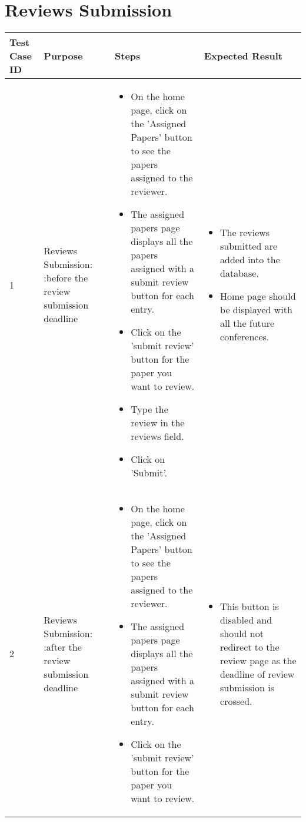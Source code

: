 \documentclass[english,a4paper,12pt]{report}
\begin{document}
\section{Reviews Submission }
\begin{longtable} { | p{2cm} | p{3cm}| p{6cm}| p{6cm} |} 
\hline 
\textbf{Test Case ID} & \textbf{Purpose}  & \textbf{Steps} &\textbf{Expected Result} \\
\hline 1 &  Reviews Submission: :before the review submission deadline &  
\vspace{-5mm}
\begin{itemize}
\item On the home page, click on the 'Assigned Papers' button to see the papers assigned to the reviewer.
\item The assigned papers page displays all the papers assigned with a submit review button for each entry.
\item Click on the 'submit review' button for the paper you want to review.
\item Type the review in the reviews field.
\item Click on 'Submit'.
\end{itemize}&
\vspace{-5mm}
\begin{itemize}
\item The reviews submitted are added into the database.
\item Home page should be displayed with all the future conferences.
\end{itemize}\\
\hline 2 &  Reviews Submission: :after the review submission deadline &  
\vspace{-5mm}
\begin{itemize}
\item On the home page, click on the 'Assigned Papers' button to see the papers assigned to the reviewer.
\item The assigned papers page displays all the papers assigned with a submit review button for each entry.
\item Click on the 'submit review' button for the paper you want to review.
\end{itemize}&
\vspace{-5mm}
\begin{itemize}
\item This button is disabled and should not redirect to the review page as the deadline of review submission is crossed.
\end{itemize}\\

\hline
\end{longtable}
\end{document}
